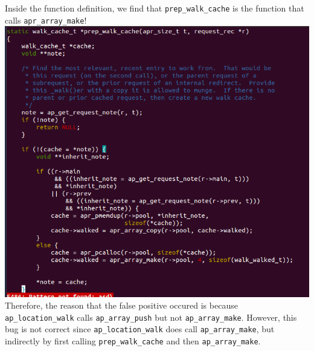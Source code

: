 \documentclass{article}
\begin{document}
Inside the function definition, we find that \verb|prep_walk_cache| is the function that calls \verb|apr_array_make|! \\
\includegraphics[scale=0.5]{ss/unravel_one_level_proof.png} \\
Therefore, the reason that the false positive occured is because \verb|ap_location_walk| calls \verb|ap_array_push| but not \verb|ap_array_make|. However, this bug is not correct since \verb|ap_location_walk| does call \verb|ap_array_make|, but indirectly by first calling \verb|prep_walk_cache| and then \verb|ap_array_make|. \\
\end{document}
